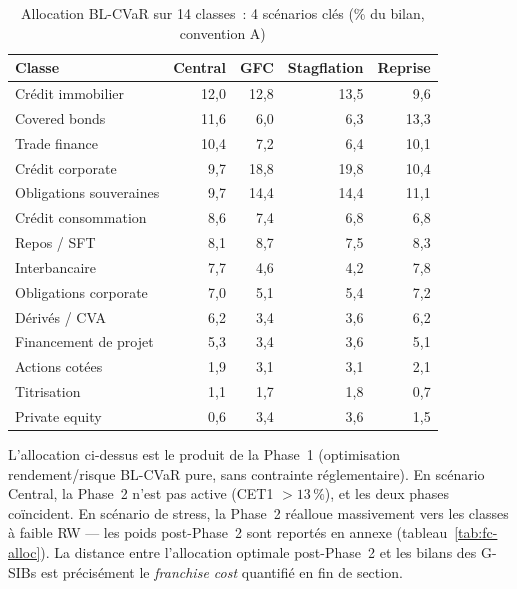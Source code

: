 \documentclass[10pt, a4paper, oneside]{report}
\theoremstyle{definition}
\begin{document}
\begin{table}[htbp]
\centering
\caption{Allocation BL-CVaR sur 14 classes~: 4 scénarios clés (\% du bilan, convention A)}
\label{tab:alloc-14}
\small
\begin{tabular}{lrrrr}
\toprule
Classe & Central & GFC & Stagflation & Reprise \\
\midrule
Crédit immobilier       & 12{,}0 & 12{,}8 & 13{,}5 &  9{,}6 \\
Covered bonds           & 11{,}6 &  6{,}0 &  6{,}3 & 13{,}3 \\
Trade finance           & 10{,}4 &  7{,}2 &  6{,}4 & 10{,}1 \\
Crédit corporate        &  9{,}7 & 18{,}8 & 19{,}8 & 10{,}4 \\
Obligations souveraines &  9{,}7 & 14{,}4 & 14{,}4 & 11{,}1 \\
Crédit consommation     &  8{,}6 &  7{,}4 &  6{,}8 &  6{,}8 \\
Repos / SFT             &  8{,}1 &  8{,}7 &  7{,}5 &  8{,}3 \\
Interbancaire           &  7{,}7 &  4{,}6 &  4{,}2 &  7{,}8 \\
Obligations corporate   &  7{,}0 &  5{,}1 &  5{,}4 &  7{,}2 \\
Dérivés / CVA           &  6{,}2 &  3{,}4 &  3{,}6 &  6{,}2 \\
Financement de projet   &  5{,}3 &  3{,}4 &  3{,}6 &  5{,}1 \\
Actions cotées          &  1{,}9 &  3{,}1 &  3{,}1 &  2{,}1 \\
Titrisation             &  1{,}1 &  1{,}7 &  1{,}8 &  0{,}7 \\
Private equity          &  0{,}6 &  3{,}4 &  3{,}6 &  1{,}5 \\
\bottomrule
\end{tabular}
\end{table}

\noindent L'allocation ci-dessus est le produit de la Phase~1 (optimisation rendement/risque BL-CVaR pure, sans contrainte réglementaire). En scénario Central, la Phase~2 n'est pas active (CET1 $> 13\,\%$), et les deux phases coïncident. En scénario de stress, la Phase~2 réalloue massivement vers les classes à faible RW --- les poids post-Phase~2 sont reportés en annexe (tableau~\ref{tab:fc-alloc}). La distance entre l'allocation optimale post-Phase~2 et les bilans des G-SIBs est précisément le \emph{franchise cost} quantifié en fin de section.
\end{document}

